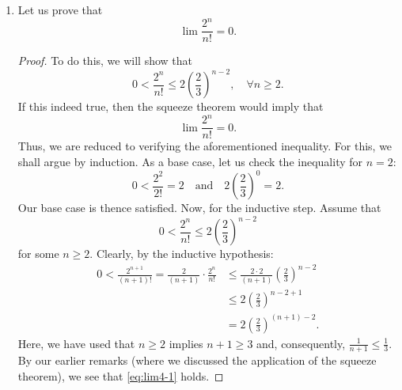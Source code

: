 \documentclass[12pt, reqno]{article}
\numberwithin{equation}{section}
\theoremstyle{definition}
\theoremstyle{remark}
\newcommand{\NN}{\mathbb{N}}
\newcommand{\abs}[1]{\left\lvert#1\right\rvert}
\renewcommand{\epsilon}{\varepsilon}
\begin{document}
\begin{enumerate}[leftmargin=*]
\begin{proof}
\begin{align*}
		      \end{align*}
		      Now, it will be easier to find our candidate for $N$. Let $N \in \NN$ be such that $$N > \frac{2}{\sqrt{\epsilon}},$$ which we know to exist by the Archimedean property. If $n \geq N$, then our estimate above tells us that
		      \begin{align*}
			      \abs{ \frac{n^2-1}{2n^2 + 3} - \frac{1}{2}}  \leq \frac{4}{n^2} \leq \frac{4}{N^2} < 4 \cdot \frac{\epsilon}{4} = \epsilon.
		      \end{align*}
		      This is what had to be shown.
	      \end{proof}
	\item Let us prove that
	      \begin{equation}\label{eq:lim4-1}
		      \lim{\frac{2^n}{n!}} = 0.
	      \end{equation}
	      \begin{proof}
		      To do this, we will show that
		      \[
			      0 < \frac{2^n}{n!} \leq 2\left(\frac{2}{3}\right)^{n-2}, \quad \forall n \geq 2.
		      \]
		      If this indeed true, then the squeeze theorem would imply that
		      \[
			      \lim{\frac{2^n}{n!}} = 0.
		      \]
		      Thus, we are reduced to verifying the aforementioned inequality. For this, we shall argue by induction. As a base case, let us check the inequality for $n=2$:
		      \[
			      0 < \frac{2^2}{2!} = 2 \quad \text{and} \quad 2\left(\frac{2}{3}\right)^{0} = 2.
		      \]
		      Our base case is thence satisfied. Now, for the inductive step. Assume that
		      \[0 < \frac{2^n}{n!} \leq 2\left(\frac{2}{3}\right)^{n-2}\]
		      for some $n \geq 2$. Clearly, by the inductive hypothesis:
		      \begin{align*}
			      0 < \frac{2^{n+1}}{(n+1)!} = \frac{2}{(n+1)} \cdot \frac{2^n}{n!} & \leq \frac{2 \cdot 2}{(n+1)} \left(\frac{2}{3}\right)^{n-2} \\
			                                                                        & \leq 2 \left(\frac{2}{3}\right)^{n-2 + 1}                   \\
			                                                                        & =2 \left(\frac{2}{3}\right)^{(n + 1) - 2}.
		      \end{align*}
		      Here, we have used that $n\geq 2$ implies $n+1 \geq 3$ and, consequently, $\frac{1}{n+1} \leq \frac{1}{3}$. By our earlier remarks (where we discussed the application of the squeeze theorem), we see that \eqref{eq:lim4-1} holds.
	      \end{proof}

\end{enumerate}
\end{document}
